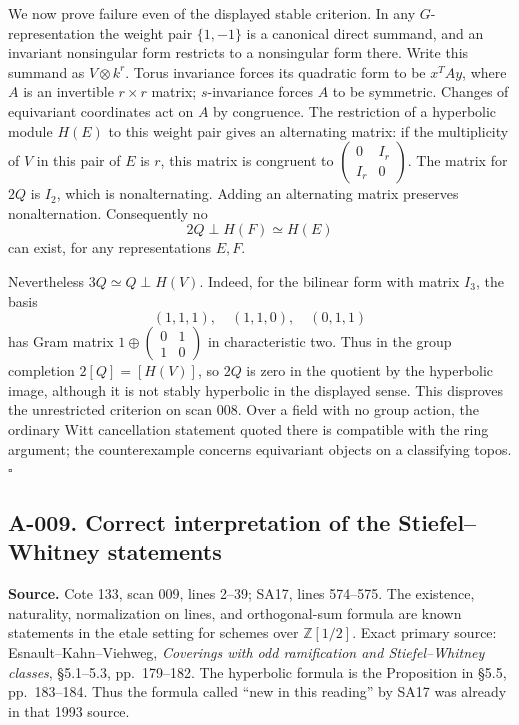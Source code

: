 \documentclass[11pt]{article}
\begin{document}
We now prove failure even of the displayed stable criterion.  In any
$G$-representation the weight pair $\{1,-1\}$ is a canonical direct
summand, and an invariant nonsingular form restricts to a nonsingular
form there.  Write this summand as $V\otimes k^r$.  Torus invariance
forces its quadratic form to be $x^TAy$, where $A$ is an invertible
$r\times r$ matrix; $s$-invariance forces $A$ to be symmetric.  Changes
of equivariant coordinates act on $A$ by congruence.  The restriction
of a hyperbolic module $H(E)$ to this weight pair gives an alternating
matrix: if the multiplicity of $V$ in this pair of $E$ is $r$, this
matrix is congruent to
$\left(\begin{smallmatrix}0&I_r\\I_r&0\end{smallmatrix}\right)$.
The matrix for $2Q$ is $I_2$, which is nonalternating.  Adding an
alternating matrix preserves nonalternation.  Consequently no
\[
 2Q\perp H(F)\simeq H(E)
\]
can exist, for any representations $E,F$.

Nevertheless $3Q\simeq Q\perp H(V)$.  Indeed, for the bilinear form
with matrix $I_3$, the basis
\[
 (1,1,1),\quad(1,1,0),\quad(0,1,1)
\]
has Gram matrix $1\oplus
\left(\begin{smallmatrix}0&1\\1&0\end{smallmatrix}\right)$ in
characteristic two.  Thus in the group completion
$2[Q]=[H(V)]$, so $2Q$ is zero in the quotient by the hyperbolic image,
although it is not stably hyperbolic in the displayed sense.
This disproves the unrestricted criterion on scan 008.  Over a field
with no group action, the ordinary Witt cancellation statement quoted
there is compatible with the ring argument; the counterexample concerns
equivariant objects on a classifying topos. \hfill$\square$

\subsection*{A-009. Correct interpretation of the Stiefel--Whitney statements}
\textbf{Source.} Cote 133, scan 009, lines 2--39; SA17, lines 574--575.
The existence, naturality, normalization on lines, and orthogonal-sum
formula are known statements in the etale setting for schemes over
$\mathbb Z[1/2]$. Exact primary source: Esnault--Kahn--Viehweg,
\emph{Coverings with odd ramification and Stiefel--Whitney classes},
\S5.1--5.3, pp.~179--182. The hyperbolic formula is the Proposition in
\S5.5, pp.~183--184. Thus the formula called ``new in this reading''
by SA17 was already in that 1993 source.
\end{document}
